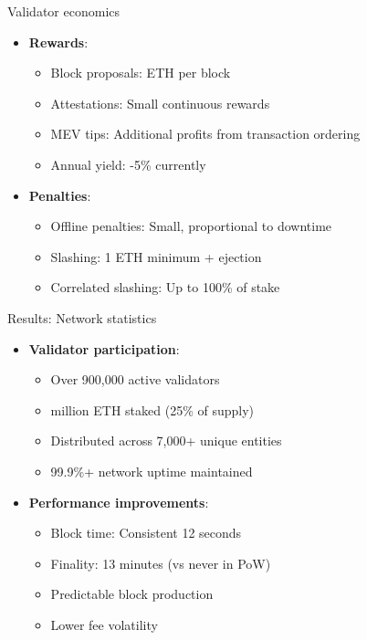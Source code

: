\documentclass[aspectratio=169, lualatex, handout]{beamer}
\begin{document}
\begin{frame}{Validator economics}
	\begin{itemize}
		\item \textbf{Rewards}:
		      \begin{itemize}
			      \item Block proposals:  ETH per block
			      \item Attestations: Small continuous rewards
			      \item MEV tips: Additional profits from transaction ordering
			      \item Annual yield: -5\% currently
		      \end{itemize}
		\item \textbf{Penalties}:
		      \begin{itemize}
			      \item Offline penalties: Small, proportional to downtime
			      \item Slashing: 1 ETH minimum + ejection
			      \item Correlated slashing: Up to 100\% of stake
		      \end{itemize}
	\end{itemize}
\end{frame}

\begin{frame}{Results: Network statistics}
	\begin{itemize}
		\item \textbf{Validator participation}:
		      \begin{itemize}
			      \item Over 900,000 active validators
			      \item {} million ETH staked (25\% of supply)
			      \item Distributed across 7,000+ unique entities
			      \item 99.9\%+ network uptime maintained
		      \end{itemize}
		\item \textbf{Performance improvements}:
		      \begin{itemize}
			      \item Block time: Consistent 12 seconds
			      \item Finality: 13 minutes (vs never in PoW)
			      \item Predictable block production
			      \item Lower fee volatility
		      \end{itemize}
	\end{itemize}
\end{frame}
\end{document}
